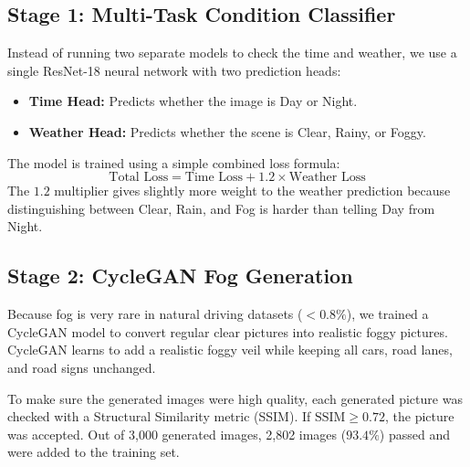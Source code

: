 \documentclass{article}
\begin{document}
\subsection{Stage 1: Multi-Task Condition Classifier}
Instead of running two separate models to check the time and weather, we use a single ResNet-18 neural network with two prediction heads:
\begin{itemize}
    \item \textbf{Time Head:} Predicts whether the image is Day or Night.
    \item \textbf{Weather Head:} Predicts whether the scene is Clear, Rainy, or Foggy.
\end{itemize}
The model is trained using a simple combined loss formula:
\begin{equation}
\text{Total Loss} = \text{Time Loss} + 1.2 \times \text{Weather Loss}
\end{equation}
The $1.2$ multiplier gives slightly more weight to the weather prediction because distinguishing between Clear, Rain, and Fog is harder than telling Day from Night.

\subsection{Stage 2: CycleGAN Fog Generation}
Because fog is very rare in natural driving datasets ($<0.8\%$), we trained a CycleGAN model to convert regular clear pictures into realistic foggy pictures. CycleGAN learns to add a realistic foggy veil while keeping all cars, road lanes, and road signs unchanged.

To make sure the generated images were high quality, each generated picture was checked with a Structural Similarity metric (SSIM). If $\text{SSIM} \ge 0.72$, the picture was accepted. Out of 3,000 generated images, 2,802 images ($93.4\%$) passed and were added to the training set.
\end{document}
